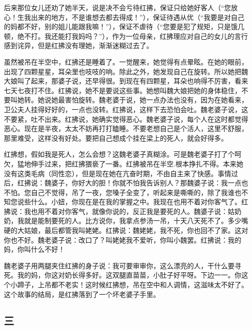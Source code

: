 后来那位女儿还劝了她半天，说是决不会亏待红拂，保证只给她好客人（“您放心！生我出来的地方，不是谁想去都去得成！”），保证待遇从优（“我要是对自己的妈都不好，别的姐儿能跟我嘛！”），保证不虐待（“您要是犯了规矩，只是饿几顿，绝不打。我还能打我妈吗？”），作为一位母亲，红拂理应对自己的女儿的言行感到诧异，但是红拂没有理她，渐渐迷糊过去了。 

虽然被吊在半空中，红拂还是睡着了。一觉醒来，她觉得有点晕眩。在她的眼前，出现了四颗星星，耳朵里也吱吱的响。除此之外，她发现自己在旋转。所以她把魏大娘叫了起来，那婆子说，还早得很。到现在有四颗星，耳朵也响得不厉害，看来七天七夜打不住。红拂说，她不是要说这些事。她想叫魏大娘把她的身体稳住，不要叫她转。她说她最害怕旋转。魏老婆于说，她一点办法也没有，因为在她看来，卫公夫人挂得好好的，一点也没转。红拂说，这样下去恐怕会吐。魏老婆子说，这不要紧，吐不出来。红拂说，她确实觉得恶心。魏老婆子说，每个人在这时都觉得恶心。现在是半夜，太太不妨再打打瞌睡。不要老想自己是个活人，这里不舒服，那里难受，这样没有好处。要把自己想成个挂在梁上的死人，就会好得多。 

红拂想，假如我是死人，怎么会想？这魏老婆子真糊涂。可是魏老婆子打了个呵欠，猛地伸手过来，把红拂猥亵了一番。红拂被吊在半空.根本挣扎不得。本来她没有这类毛病（同性恋），但是现在她在亢奋时期，不由自主来了快感。事情过后，红拂说：魏婆子，你好大的胆！你就不怕我告诉别人？那魏婆子说：我一点也不怕。您自己不觉得，吊了一夜，您嗓子全变了，听起来是嘶嘶的，除了我谁也不知您说些什么。小妞，你现在是在我的掌握之中。我现在也用不着对你客气了。红拂说：我也用不着对你客气，就像你说的，反正我是要死的人。魏婆子说：姑奶奶，我就是能制要死的人。比方说你，我拿点参汤一吊，十天八天死不了。多少嘴硬的大姑娘，最后都管我叫姥姥。红拂说：魏姥姥，我不死，你也回不了家。这对你也不好。魏老婆子说：改口了？叫姥姥我不爱听，你叫小魏罢。红拂说：我的妈，你叫什么不好！ 

魏老婆子用两腿夹住红拂的身子说：我可要审审你，这么漂亮的人，干什么要寻死。我的妈，你这对奶长得多好。这双腿直苗苗，小肚子好平呀。下边一一。你这个小蹄子，上吊都不老实！这时候红拂想，吊在空中和人调情，这滋味太不好了。这个故事的结局，是红拂落到了一个坏老婆子手里。 

\subsection{三} 

